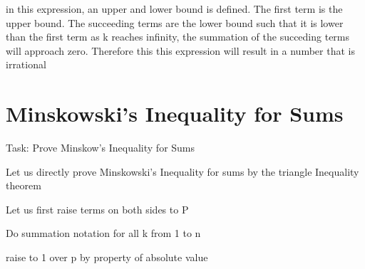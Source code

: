 \documentclass[12pt, a4paper]{article}
\begin{document}
\centering{\fontsize{17.28pt}{18pt}\selectfont

\[
  =  \frac{1}{a + 1} - \frac{1}{(a + 1)(a + 2)} + \dots
\]

}

\vspace{1cm}
\raggedright

in this expression, an upper and lower bound is defined. The first term is the 
upper bound. The succeeding terms are the lower bound such that it is lower than the first term
as k reaches infinity, the summation of the succeding terms will approach zero. Therefore this
this expression will result in a number that is irrational

\newpage
\raggedright
\section{Minskowski's Inequality for Sums}

Task: Prove Minskow's Inequality for Sums


\vspace{1cm}
\raggedright
Let us directly prove Minskowski's Inequality for sums by the
triangle Inequality theorem

\vspace{1cm}

\raggedright
Let us first raise terms on both sides to P

\centering{\fontsize{17.28pt}{18pt}\selectfont

\[
    |a + b|^{p} \leq |a|^{p} + |b|^{p}  
\]
}

\raggedright

Do summation notation for all k from 1 to n

\centering{\fontsize{17.28pt}{18pt}\selectfont

\[
  \sum_{k = 1}^{n} |a_k + b_k|^{p} \leq \sum_{k=1}^{n} |a_k|^{p} + \sum_{k =1 }^{n} |b_k|^{p} 
\]

}

\raggedright

raise to 1 over p by property of absolute value

\end{document}
